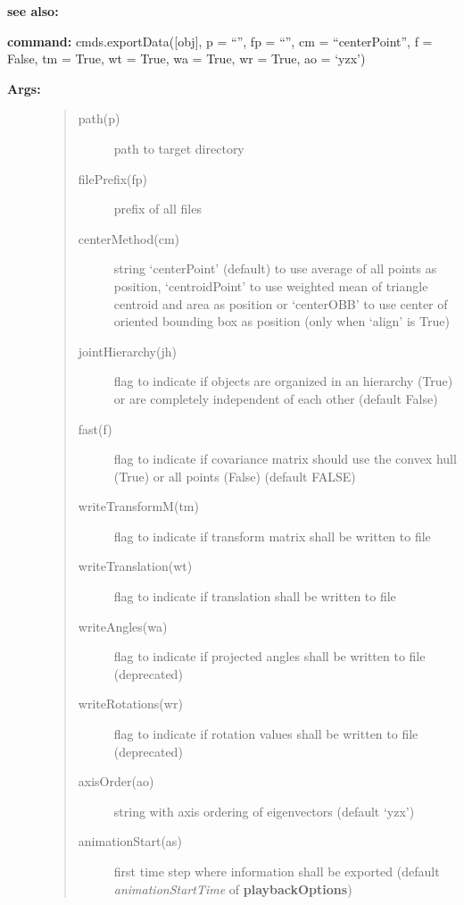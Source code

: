 \documentclass[letterpaper,10pt,english]{sphinxmanual}
\begin{document}
\textbf{see also:} {\hyperref[pk_src.normalize:normalize]{}}

\textbf{command:} cmds.exportData({[}obj{]}, p = ``'', fp = ``'', cm = ``centerPoint'', f = False, tm = True, wt = True, wa = True, wr = True, ao = `yzx')
\begin{description}
\item[{\textbf{Args:}}] \leavevmode\begin{quote}\begin{description}
\item[{path(p)}] \leavevmode
path to target directory

\item[{filePrefix(fp)}] \leavevmode
prefix of all files

\item[{centerMethod(cm)}] \leavevmode
string `centerPoint' (default) to use average of all points as position, `centroidPoint' to use weighted mean of triangle centroid and area as position or `centerOBB' to use center of oriented bounding box as position (only when `align' is True)

\item[{jointHierarchy(jh)}] \leavevmode
flag to indicate if objects are organized in an hierarchy (True) or are completely independent of each other (default False)

\item[{fast(f)}] \leavevmode
flag to indicate if covariance matrix  should use the convex hull (True) or all points (False) (default FALSE)

\item[{writeTransformM(tm)}] \leavevmode
flag to indicate if transform matrix shall be written to file

\item[{writeTranslation(wt)}] \leavevmode
flag to indicate if translation shall be written to file

\item[{writeAngles(wa)}] \leavevmode
flag to indicate if projected angles shall be written to file (deprecated)

\item[{writeRotations(wr)}] \leavevmode
flag to indicate if rotation values shall be written to file (deprecated)

\item[{axisOrder(ao)}] \leavevmode
string with axis ordering of eigenvectors (default `yzx')

\item[{animationStart(as)}] \leavevmode
first time step where information shall be exported (default \emph{animationStartTime} of \textbf{playbackOptions})


\end{description}
\end{quote}
\end{description}
\end{document}
